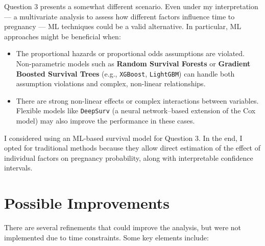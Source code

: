 \documentclass[11pt]{article}
\begin{document}
Question 3 presents a somewhat different scenario. Even under my interpretation — a multivariate analysis to assess how different factors influence time to pregnancy — ML techniques could be a valid alternative. In particular, ML approaches might be beneficial when:

\begin{itemize}
    \item The proportional hazards or proportional odds assumptions are violated. Non-parametric models such as \textbf{Random Survival Forests} or \textbf{Gradient Boosted Survival Trees} (e.g., \texttt{XGBoost}, \texttt{LightGBM}) can handle both assumption violations and complex, non-linear relationships.
    \item There are strong non-linear effects or complex interactions between variables. Flexible models like \texttt{DeepSurv} (a neural network–based extension of the Cox model) may also improve the performance in these cases.
\end{itemize}

I considered using an ML-based survival model for Question 3. In the end, I opted for traditional methods because they allow direct estimation of the effect of individual factors on pregnancy probability, along with interpretable confidence intervals.


\section{Possible Improvements}
\label{sec:improvements}

There are several refinements that could improve the analysis, but were not implemented due to time constraints. Some key elements include:
\end{document}
